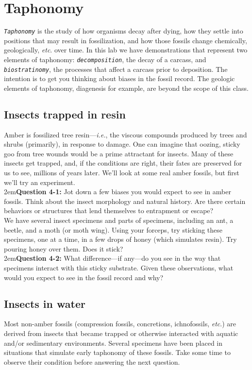 \documentclass[letterpaper, 11pt]{article}
\newcommand{\latinword}[1]{\texttt{\itshape #1}}%
\begin{document}
\section{Taphonomy}
\latinword{Taphonomy} is the study of how organisms decay after dying, how they settle into positions that may result in fossilization, and how those fossils change chemically, geologically, \textit{etc}. over time. In this lab we have demonstrations that represent two elements of taphonomy: \latinword{decomposition}, the decay of a carcass, and \latinword{biostratinomy}, the processes that affect a carcass prior to deposition. The intention is to get you thinking about biases in the fossil record. The geologic elements of taphonomy, diagenesis for example, are beyond the scope of this class.

\subsection{Insects trapped in resin}
Amber is fossilized tree resin---\textit{i.e.}, the viscous compounds produced by trees and shrubs (primarily), in response to damage. One can imagine that oozing, sticky goo from tree wounds would be a prime attractant for insects. Many of these insects get trapped, and, if the conditions are right, their fates are preserved for us to see, millions of years later. We'll look at some real amber fossils, but first we'll try an experiment.\\

\hangindent2em\textbf{Question 4-1:} Jot down a few biases you would expect to see in amber fossils. Think about the insect morphology and natural history. Are there certain behaviors or structures that lend themselves to entrapment or escape? \\

\noindent{}We have several insect specimens and parts of specimens, including an ant, a beetle, and a moth (or moth wing). Using your forceps, try sticking these specimens, one at a time, in a few drops of honey (which simulates resin). Try pouring honey over them. Does it stick?\\

\hangindent2em\textbf{Question 4-2:} What difference---if any---do you see in the way that specimens interact with this sticky substrate. Given these observations, what would you expect to see in the fossil record and why?

\subsection{Insects in water}
Most non-amber fossils (compression fossils, concretions, ichnofossils, \textit{etc}.) are derived from insects that became trapped or otherwise interacted with aquatic and/or sedimentary environments. Several specimens have been placed in situations that simulate early taphonomy of these fossils. Take some time to observe their condition before answering the next question.\\
\end{document}

